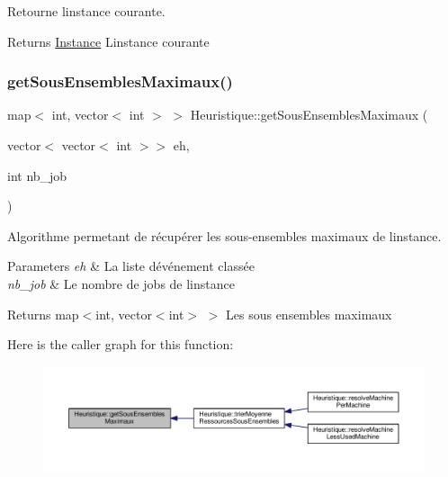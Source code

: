 Retourne l\textquotesingle{}instance courante. 

\begin{DoxyReturn}{Returns}
\hyperlink{classInstance}{Instance} L\textquotesingle{}instance courante 
\end{DoxyReturn}
\mbox{\label{classHeuristique_a6799e05f33af7ac257ba56b9921a8baf}} 
\subsubsection{\texorpdfstring{get\+Sous\+Ensembles\+Maximaux()}{getSousEnsemblesMaximaux()}}
{\footnotesize\ttfamily map$<$ int, vector$<$ int $>$ $>$ Heuristique\+::get\+Sous\+Ensembles\+Maximaux (\begin{DoxyParamCaption}\item[{vector$<$ vector$<$ int $>$$>$}]{eh,  }\item[{int}]{nb\+\_\+job }\end{DoxyParamCaption})}



Algorithme permetant de récupérer les sous-\/ensembles maximaux de l\textquotesingle{}instance. 


\begin{DoxyParams}{Parameters}
{\em eh} & La liste d\textquotesingle{}événement classée \\
\hline
{\em nb\+\_\+job} & Le nombre de jobs de l\textquotesingle{}instance \\
\hline
\end{DoxyParams}
\begin{DoxyReturn}{Returns}
map$<$int, vector$<$int$>$ $>$ Les sous ensembles maximaux 
\end{DoxyReturn}
Here is the caller graph for this function\+:\nopagebreak
\begin{figure}[H]
\begin{center}
\leavevmode
\includegraphics[width=350pt]{classHeuristique_a6799e05f33af7ac257ba56b9921a8baf_icgraph}
\end{center}
\end{figure}
\mbox{\label{classHeuristique_aa590500fc2368d1ea58ab483b2377fea}} 
